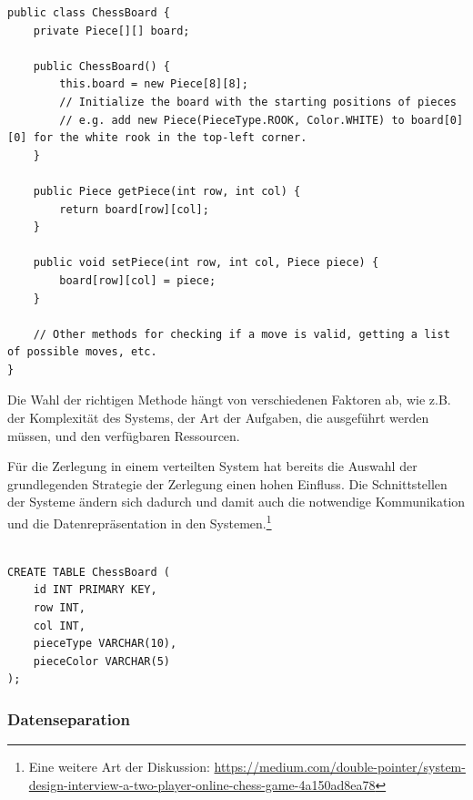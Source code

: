 \noindent\begin{minipage}{\textwidth}
\begin{lstlisting}[caption={Schachbrett - Objektorientiert},captionpos=b,label={lst:schachbrett-oo}]
public class ChessBoard {
    private Piece[][] board;

    public ChessBoard() {
        this.board = new Piece[8][8];
        // Initialize the board with the starting positions of pieces
        // e.g. add new Piece(PieceType.ROOK, Color.WHITE) to board[0][0] for the white rook in the top-left corner.
    }

    public Piece getPiece(int row, int col) {
        return board[row][col];
    }

    public void setPiece(int row, int col, Piece piece) {
        board[row][col] = piece;
    }

    // Other methods for checking if a move is valid, getting a list of possible moves, etc.
}
\end{lstlisting}
\end{minipage}

Die Wahl der richtigen Methode hängt von verschiedenen Faktoren ab, wie z.B. der Komplexität des Systems, der Art der Aufgaben, die ausgeführt werden müssen, und den verfügbaren Ressourcen.

Für die Zerlegung in einem verteilten System hat bereits die Auswahl der grundlegenden Strategie der Zerlegung einen hohen Einfluss. Die Schnittstellen der Systeme ändern sich dadurch und damit auch die notwendige Kommunikation und die Datenrepräsentation in den Systemen.\footnote{Eine weitere Art der Diskussion: \url{https://medium.com/double-pointer/system-design-interview-a-two-player-online-chess-game-4a150ad8ea78} }

\noindent\begin{minipage}{\textwidth}
\begin{lstlisting}[caption={Schachbrett - Datenbank},captionpos=b,label={lst:schachbrett-datenbank}]

CREATE TABLE ChessBoard (
    id INT PRIMARY KEY,
    row INT,
    col INT,
    pieceType VARCHAR(10),
    pieceColor VARCHAR(5)
);
\end{lstlisting}
\end{minipage}


\subsubsection{Datenseparation}

